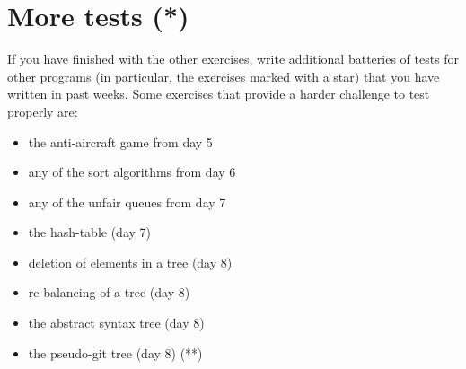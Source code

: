 \documentclass{article}
\begin{document}


\section{More tests (*)}
\label{sec:more-tests-}

If you have finished with the other exercises, write additional
batteries of tests for other programs (in particular, the exercises
marked with a star)  that you have written in past
weeks. Some exercises that provide a harder challenge to test properly
are: 

\begin{itemize}
\item the anti-aircraft game from day 5
\item any of the sort algorithms from day 6
\item any of the unfair queues from day 7
\item the hash-table (day 7)
\item deletion of elements in a tree (day 8)
\item re-balancing of a tree (day 8)
\item the abstract syntax tree (day 8)
\item the pseudo-git tree (day 8) (**)
\end{itemize}
\end{document}
